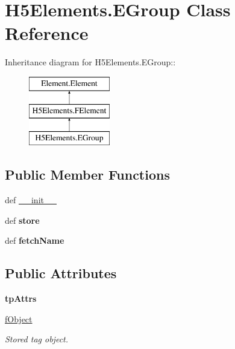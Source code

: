 \hypertarget{classH5Elements_1_1EGroup}{
\section{H5Elements.EGroup Class Reference}
\label{classH5Elements_1_1EGroup}
}
Inheritance diagram for H5Elements.EGroup::\begin{figure}[H]
\begin{center}
\leavevmode
\includegraphics[height=3cm]{classH5Elements_1_1EGroup}
\end{center}
\end{figure}
\subsection*{Public Member Functions}
\begin{DoxyCompactItemize}
\item 
def \hyperlink{classH5Elements_1_1EGroup_a3ab898c36d1fa91a226417a3296a651b}{\_\-\_\-init\_\-\_\-}
\item 
\hypertarget{classH5Elements_1_1EGroup_a16ec0be870d3751c0af90b2fb64e34cc}{
def {\bfseries store}}
\label{classH5Elements_1_1EGroup_a16ec0be870d3751c0af90b2fb64e34cc}

\item 
\hypertarget{classH5Elements_1_1EGroup_abccdc92a4b4de689590502b11a0820af}{
def {\bfseries fetchName}}
\label{classH5Elements_1_1EGroup_abccdc92a4b4de689590502b11a0820af}

\end{DoxyCompactItemize}
\subsection*{Public Attributes}
\begin{DoxyCompactItemize}
\item 
\hypertarget{classH5Elements_1_1EGroup_af0bee9c867e8b439a291ab2f09f2516e}{
{\bfseries tpAttrs}}
\label{classH5Elements_1_1EGroup_af0bee9c867e8b439a291ab2f09f2516e}

\item 
\hypertarget{classH5Elements_1_1EGroup_aeb9bf60e89f45e2df375c9e5081e736d}{
\hyperlink{classH5Elements_1_1EGroup_aeb9bf60e89f45e2df375c9e5081e736d}{fObject}}
\label{classH5Elements_1_1EGroup_aeb9bf60e89f45e2df375c9e5081e736d}

\begin{DoxyCompactList}\small\item\em Stored tag object. \item\end{DoxyCompactList}\end{DoxyCompactItemize}


